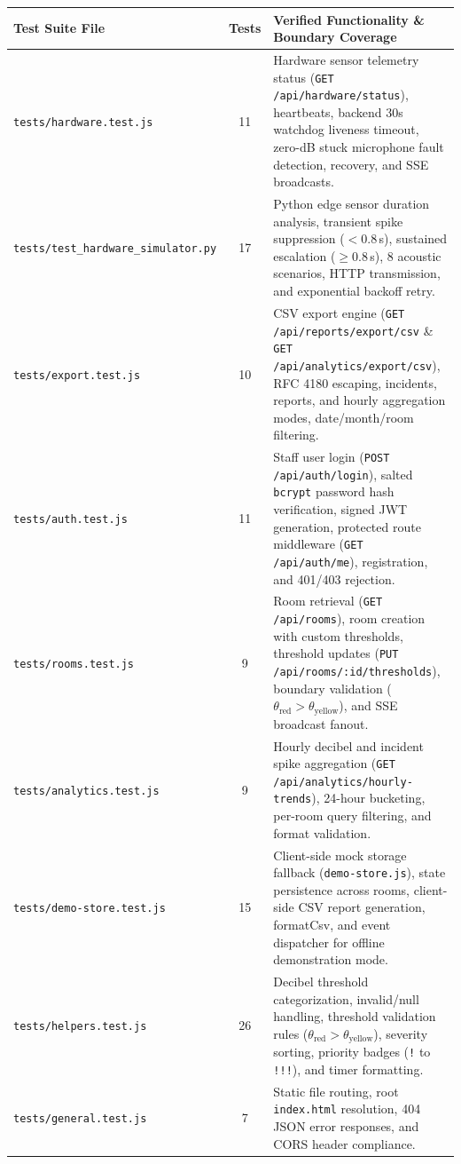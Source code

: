 \documentclass[11pt,a4paper]{article}
\begin{document}
\begin{table}[H]
\centering
\small
\begin{tabularx}{\textwidth}{l c X}
\toprule
\textbf{Test Suite File} & \textbf{Tests} & \textbf{Verified Functionality \& Boundary Coverage} \\
\midrule
\texttt{tests/hardware.test.js} & 11 & Hardware sensor telemetry status (\texttt{GET /api/hardware/status}), heartbeats, backend 30s watchdog liveness timeout, zero-dB stuck microphone fault detection, recovery, and SSE broadcasts. \\
\texttt{tests/test\_hardware\_simulator.py} & 17 & Python edge sensor duration analysis, transient spike suppression ($<0.8$\,s), sustained escalation ($\ge 0.8$\,s), 8 acoustic scenarios, HTTP transmission, and exponential backoff retry. \\
\texttt{tests/export.test.js} & 10 & CSV export engine (\texttt{GET /api/reports/export/csv} \& \texttt{GET /api/analytics/export/csv}), RFC 4180 escaping, incidents, reports, and hourly aggregation modes, date/month/room filtering. \\
\texttt{tests/auth.test.js} & 11 & Staff user login (\texttt{POST /api/auth/login}), salted \texttt{bcrypt} password hash verification, signed JWT generation, protected route middleware (\texttt{GET /api/auth/me}), registration, and 401/403 rejection. \\
\texttt{tests/rooms.test.js} & 9 & Room retrieval (\texttt{GET /api/rooms}), room creation with custom thresholds, threshold updates (\texttt{PUT /api/rooms/:id/thresholds}), boundary validation ($\theta_{\text{red}} > \theta_{\text{yellow}}$), and SSE broadcast fanout. \\
\texttt{tests/analytics.test.js} & 9 & Hourly decibel and incident spike aggregation (\texttt{GET /api/analytics/hourly-trends}), 24-hour bucketing, per-room query filtering, and format validation. \\
\texttt{tests/demo-store.test.js} & 15 & Client-side mock storage fallback (\texttt{demo-store.js}), state persistence across rooms, client-side CSV report generation, formatCsv, and event dispatcher for offline demonstration mode. \\
\texttt{tests/helpers.test.js} & 26 & Decibel threshold categorization, invalid/null handling, threshold validation rules ($\theta_{\text{red}} > \theta_{\text{yellow}}$), severity sorting, priority badges (\texttt{!} to \texttt{!!!}), and timer formatting. \\
\texttt{tests/general.test.js} & 7 & Static file routing, root \texttt{index.html} resolution, 404 JSON error responses, and CORS header compliance. \\

\end{tabularx}
\end{table}
\end{document}

